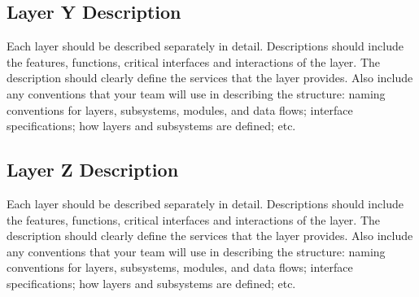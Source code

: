\subsection{Layer Y Description}
Each layer should be described separately in detail. Descriptions should include the features, functions, critical interfaces and interactions of the layer. The description should clearly define the services that the layer provides. Also include any conventions that your team will use in describing the structure: naming conventions for layers, subsystems, modules, and data flows; interface specifications; how layers and subsystems are defined; etc. 

\subsection{Layer Z Description}
Each layer should be described separately in detail. Descriptions should include the features, functions, critical interfaces and interactions of the layer. The description should clearly define the services that the layer provides. Also include any conventions that your team will use in describing the structure: naming conventions for layers, subsystems, modules, and data flows; interface specifications; how layers and subsystems are defined; etc. 